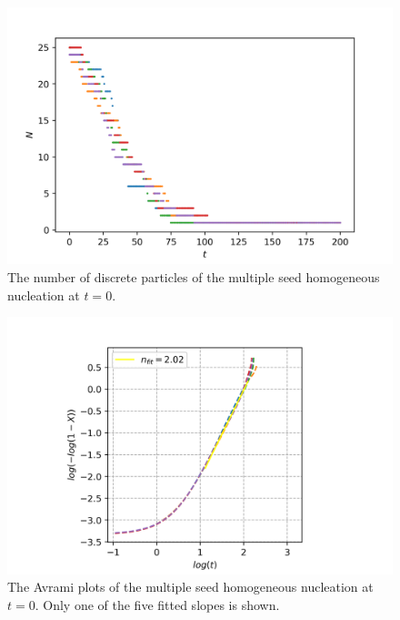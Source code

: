 \documentclass[preprint,12pt]{elsarticle}
\begin{document}
%
\begin{center}
\begin{figure} 
\begin{centering}
\includegraphics[scale=0.65]{particle_count_multiple_seed_t0.PNG}
\par\end{centering}
\caption{The number of discrete particles of the multiple seed homogeneous nucleation at $t=0$.} \label{fig:particle_count_multiple_seed_t0}
\end{figure}
\par\end{center}
%
\begin{center}
\begin{figure} 
\begin{centering}
\includegraphics[scale=0.80]{Avrami_plot_multiple_seed_t0.PNG}
\par\end{centering}
\caption{The Avrami plots of the multiple seed homogeneous nucleation at $t=0$. Only one of the five fitted slopes is shown.} \label{fig:avarmi_plot_multiple_seed_t0}
\end{figure}
\par\end{center}
\end{document}
